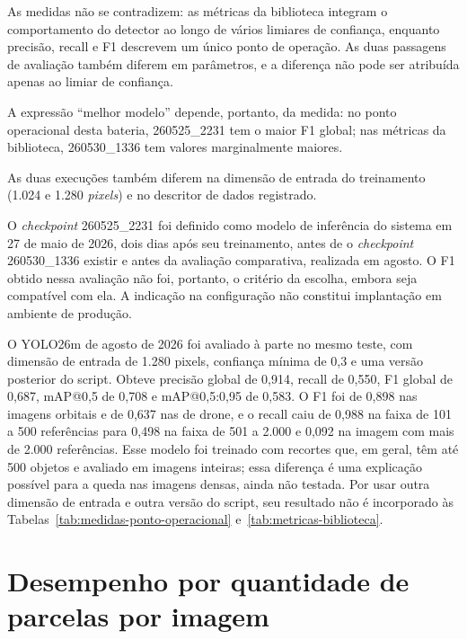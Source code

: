 As medidas n\~ao se contradizem: as m\'etricas da biblioteca integram o comportamento do detector ao longo de v\'arios limiares de confian\c{c}a, enquanto precis\~ao, recall e F1 descrevem um \'unico ponto de opera\c{c}\~ao. As duas passagens de avalia\c{c}\~ao tamb\'em diferem em par\^ametros, e a diferen\c{c}a n\~ao pode ser atribu\'ida apenas ao limiar de confian\c{c}a.

A express\~ao ``melhor modelo'' depende, portanto, da medida: no ponto operacional desta bateria, 260525\_2231 tem o maior F1 global; nas m\'etricas da biblioteca, 260530\_1336 tem valores marginalmente maiores.

As duas execu\c{c}\~oes tamb\'em diferem na dimens\~ao de entrada do treinamento (1.024 e 1.280 \textit{pixels}) e no descritor de dados registrado.

O \textit{checkpoint} 260525\_2231 foi definido como modelo de infer\^encia do sistema em 27 de maio de 2026, dois dias ap\'os seu treinamento, antes de o \textit{checkpoint} 260530\_1336 existir e antes da avalia\c{c}\~ao comparativa, realizada em agosto. O F1 obtido nessa avalia\c{c}\~ao n\~ao foi, portanto, o crit\'erio da escolha, embora seja compat\'ivel com ela. A indica\c{c}\~ao na configura\c{c}\~ao n\~ao constitui implanta\c{c}\~ao em ambiente de produ\c{c}\~ao.

O YOLO26m de agosto de 2026 foi avaliado \`a parte no mesmo teste, com dimens\~ao de entrada de 1.280 pixels, confian\c{c}a m\'inima de 0,3 e uma vers\~ao posterior do script. Obteve precis\~ao global de 0,914, recall de 0,550, F1 global de 0,687, mAP@0,5 de 0,708 e mAP@0,5:0,95 de 0,583. O F1 foi de 0,898 nas imagens orbitais e de 0,637 nas de drone, e o recall caiu de 0,988 na faixa de 101 a 500 refer\^encias para 0,498 na faixa de 501 a 2.000 e 0,092 na imagem com mais de 2.000 refer\^encias. Esse modelo foi treinado com recortes que, em geral, t\^em at\'e 500 objetos e avaliado em imagens inteiras; essa diferen\c{c}a \'e uma explica\c{c}\~ao poss\'ivel para a queda nas imagens densas, ainda n\~ao testada. Por usar outra dimens\~ao de entrada e outra vers\~ao do script, seu resultado n\~ao \'e incorporado \`as Tabelas~\ref{tab:medidas-ponto-operacional} e~\ref{tab:metricas-biblioteca}.

\section{Desempenho por quantidade de parcelas por imagem}
\label{sec:desempenho-quantidade-parcelas}

